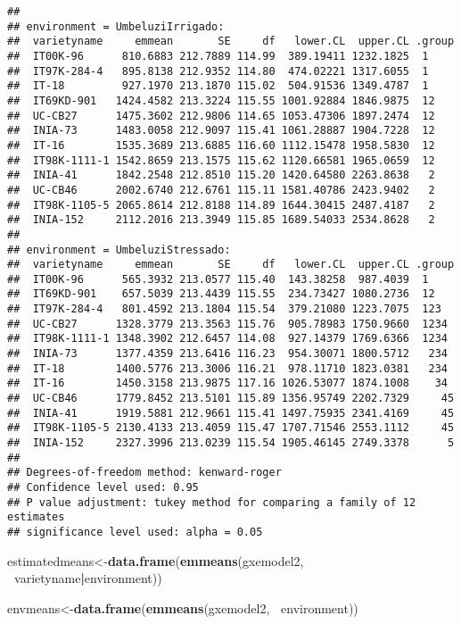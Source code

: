\documentclass[]{book}
\newenvironment{Shaded}{\begin{snugshade}}{\end{snugshade}}
\newcommand{\KeywordTok}[1]{\textcolor[rgb]{0.13,0.29,0.53}{\textbf{#1}}}
\newcommand{\OperatorTok}[1]{\textcolor[rgb]{0.81,0.36,0.00}{\textbf{#1}}}
\newcommand{\NormalTok}[1]{#1}
\theoremstyle{definition}
\theoremstyle{definition}
\theoremstyle{definition}
\theoremstyle{remark}
\begin{document}
\begin{verbatim}
## 
## environment = UmbeluziIrrigado:
##  varietyname     emmean       SE     df   lower.CL  upper.CL .group
##  IT00K-96      810.6883 212.7889 114.99  389.19411 1232.1825  1    
##  IT97K-284-4   895.8138 212.9352 114.80  474.02221 1317.6055  1    
##  IT-18         927.1970 213.1870 115.02  504.91536 1349.4787  1    
##  IT69KD-901   1424.4582 213.3224 115.55 1001.92884 1846.9875  12   
##  UC-CB27      1475.3602 212.9806 114.65 1053.47306 1897.2474  12   
##  INIA-73      1483.0058 212.9097 115.41 1061.28887 1904.7228  12   
##  IT-16        1535.3689 213.6885 116.60 1112.15478 1958.5830  12   
##  IT98K-1111-1 1542.8659 213.1575 115.62 1120.66581 1965.0659  12   
##  INIA-41      1842.2548 212.8510 115.20 1420.64580 2263.8638   2   
##  UC-CB46      2002.6740 212.6761 115.11 1581.40786 2423.9402   2   
##  IT98K-1105-5 2065.8614 212.8188 114.89 1644.30415 2487.4187   2   
##  INIA-152     2112.2016 213.3949 115.85 1689.54033 2534.8628   2   
## 
## environment = UmbeluziStressado:
##  varietyname     emmean       SE     df   lower.CL  upper.CL .group
##  IT00K-96      565.3932 213.0577 115.40  143.38258  987.4039  1    
##  IT69KD-901    657.5039 213.4439 115.55  234.73427 1080.2736  12   
##  IT97K-284-4   801.4592 213.1804 115.54  379.21080 1223.7075  123  
##  UC-CB27      1328.3779 213.3563 115.76  905.78983 1750.9660  1234 
##  IT98K-1111-1 1348.3902 212.6457 114.08  927.14379 1769.6366  1234 
##  INIA-73      1377.4359 213.6416 116.23  954.30071 1800.5712   234 
##  IT-18        1400.5776 213.3006 116.21  978.11710 1823.0381   234 
##  IT-16        1450.3158 213.9875 117.16 1026.53077 1874.1008    34 
##  UC-CB46      1779.8452 213.5101 115.89 1356.95749 2202.7329     45
##  INIA-41      1919.5881 212.9661 115.41 1497.75935 2341.4169     45
##  IT98K-1105-5 2130.4133 213.4059 115.47 1707.71546 2553.1112     45
##  INIA-152     2327.3996 213.0239 115.54 1905.46145 2749.3378      5
## 
## Degrees-of-freedom method: kenward-roger 
## Confidence level used: 0.95 
## P value adjustment: tukey method for comparing a family of 12 estimates 
## significance level used: alpha = 0.05
\end{verbatim}

\begin{Shaded}
\begin{Highlighting}[]
\NormalTok{estimatedmeans<-}\KeywordTok{data.frame}\NormalTok{(}\KeywordTok{emmeans}\NormalTok{(gxemodel2, }\OperatorTok{~}\NormalTok{varietyname}\OperatorTok{|}\NormalTok{environment))}

\NormalTok{envmeans<-}\KeywordTok{data.frame}\NormalTok{(}\KeywordTok{emmeans}\NormalTok{(gxemodel2, }\OperatorTok{~}\NormalTok{environment))}
\end{Highlighting}
\end{Shaded}
\end{document}
